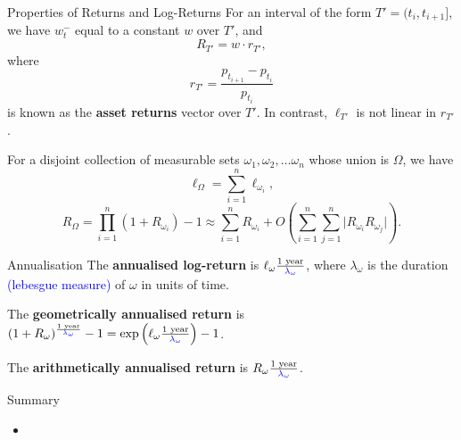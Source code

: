 \documentclass{beamer}
\begin{document}
\begin{frame}{Properties of Returns and Log-Returns}
	For an interval of the form $T' = (t_i,t_{i+1}]$, we have $w_t^-$ equal to a constant $w$ over $T'$, and
	$$R_{T'} = w \cdot r_{T'},$$
	where
	$$r_{T'} = \frac{p_{t_{i+1}} - p_{t_i}}{p_{t_i}}$$
	is known as the \textbf{asset returns} vector over $T'$. In contrast, $\ell_{T'}$ is not linear in $r_{T'}$. %

	For a disjoint collection of measurable sets $\omega_1,\omega_2,\ldots\omega_n$ whose union is $\Omega$, we have
	$$\ell_\Omega = \sum_{i=1}^n \ell_{\omega_i},$$
	$$R_\Omega = \prod_{i=1}^n (1+R_{\omega_i}) - 1 \approx \sum_{i=1}^n R_{\omega_i} + O\left(\sum_{i=1}^n\sum_{j=1}^n \vert R_{\omega_i} R_{\omega_j} \vert\right).$$
\end{frame}

\begin{frame}{Annualisation}
	The \textbf{annualised log-return} is $\ell_\omega \frac{\textrm{1 year}}{\textcolor{blue}{\lambda_\omega}}$, where $\lambda_\omega$ is the duration \textcolor{blue}{(lebesgue measure)} of $\omega$ in units of time.%

	The \textbf{geometrically annualised return} is $(1 + R_\omega)^\frac{\textrm{1 year}}{\textcolor{blue}{\lambda_\omega}} - 1 = \exp\left(\ell_\omega \frac{\textrm{1 year}}{\textcolor{blue}{\lambda_\omega}}\right) - 1$.

	The \textbf{arithmetically annualised return} is $R_\omega \frac{\textrm{1 year}}{\textcolor{blue}{\lambda_\omega}}$.%

\end{frame}

\begin{frame}{Summary}
	\begin{itemize}
		\item 
	\end{itemize}
\end{frame}
\end{document}
